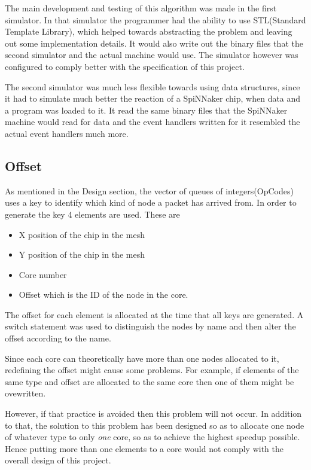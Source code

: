 \documentclass[12pt,a4paper]{article}
\begin{document}
The main development and testing of this algorithm was made in the first simulator. In that simulator the programmer had the ability to use STL(Standard Template Library), which helped towards abstracting the problem and leaving out some implementation details. It would also write out the binary files that the second simulator and the actual machine would use. The simulator however was configured to comply better with the specification of this project.

The second simulator was much less flexible towards using data structures, since it had to simulate much better the reaction of a SpiNNaker chip, when data and a program was loaded to it. It read the same binary files that the SpiNNaker machine would read for data and the event handlers written for it resembled the actual event handlers much more.

\subsection{Offset}
As mentioned in the Design section, the vector of queues of integers(OpCodes) uses a key to identify which kind of node a packet has arrived from. In order to generate the key 4 elements are used. These are
\begin{itemize}
\item X position of the chip in the mesh
\item Y position of the chip in the mesh
\item Core number
\item Offset which is the ID of the node in the core.
\end{itemize}
The offset for each element is allocated at the time that all keys are generated. A switch statement was used to distinguish the nodes by name and then alter the offset according to the name. 

Since each core can theoretically have more than one nodes allocated to it, redefining the offset might cause some problems. For example, if elements of the same type and offset are allocated to the same core then one of them might be ovewritten. 

However, if that practice is avoided then this problem will not occur. In addition to that, the solution to this problem has been designed so as to allocate one node of whatever type to only \emph{one} core, so as to achieve the highest speedup possible. Hence putting more than one elements to a core would not comply with the overall design of this project.
\end{document}
